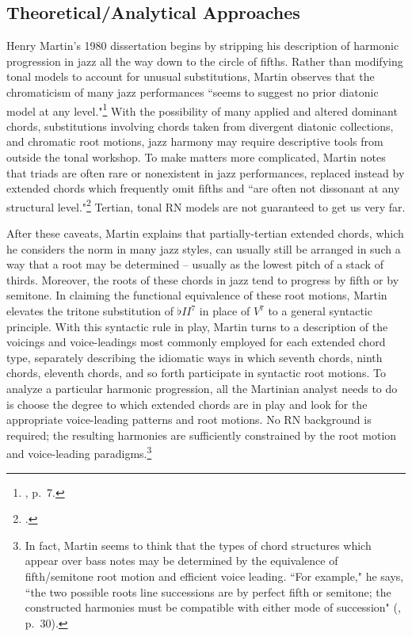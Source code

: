 \subsection{Theoretical/Analytical Approaches}
Henry Martin's 1980 dissertation begins by stripping his description of harmonic progression in jazz all the way down to the circle of fifths.  Rather than modifying tonal models to account for unusual substitutions, Martin observes that the chromaticism of many jazz performances ``seems to suggest no prior diatonic model at any level."\footnote{\cite{martin1980}, p.\ 7.}  With the possibility of many applied and altered dominant chords, substitutions involving chords taken from divergent diatonic collections, and chromatic root motions, jazz harmony may require descriptive tools from outside the tonal workshop.  To make matters more complicated, Martin notes that triads are often rare or nonexistent in jazz performances, replaced instead by extended chords which frequently omit fifths and ``are often not dissonant at any structural level."\footnote{\cite{martin1980}.}  Tertian, tonal RN models are not guaranteed to get us very far.

After these caveats, Martin explains that partially-tertian extended chords, which he considers the norm in many jazz styles, can usually still be arranged in such a way that a root may be determined -- usually as the lowest pitch of a stack of thirds.  Moreover, the roots of these chords in jazz tend to progress by fifth or by semitone.  In claiming the functional equivalence of these root motions, Martin elevates the tritone substitution of $\flat II^7$ in place of $V^7$ to a general syntactic principle.  With this syntactic rule in play, Martin turns to a description of the voicings and voice-leadings most commonly employed for each extended chord type, separately describing the idiomatic ways in which seventh chords, ninth chords, eleventh chords, and so forth participate in syntactic root motions.  To analyze a particular harmonic progression, all the Martinian analyst needs to do is choose the degree to which extended chords are in play and look for the appropriate voice-leading patterns and root motions.  No RN background is required; the resulting harmonies are sufficiently constrained by the root motion and voice-leading paradigms.\footnote{In fact, Martin seems to think that the types of chord structures which appear over bass notes may be determined by the equivalence of fifth/semitone root motion and efficient voice leading.  ``For example," he says, ``the two possible roots line successions are by perfect fifth or semitone; the constructed harmonies must be compatible with either mode of succession" (\cite{martin1980}, p.\ 30).}

